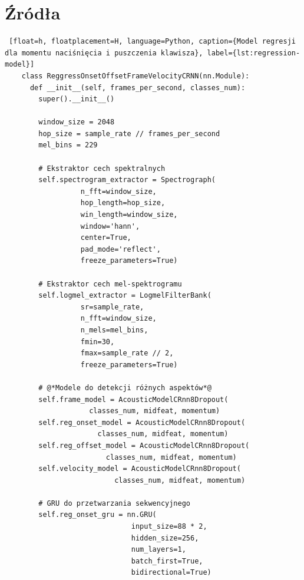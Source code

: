 \documentclass[a4paper,twoside,12pt]{book}
\begin{document}
\backmatter

\printbibliography           %

  \chapter{Źródła}
  \label{app:sources}
  
  \begin{lstlisting} [float=h, floatplacement=H, language=Python, caption={Model regresji dla momentu naciśnięcia i puszczenia klawisza}, label={lst:regression-model}]
    class ReggressOnsetOffsetFrameVelocityCRNN(nn.Module):
      def __init__(self, frames_per_second, classes_num):
        super().__init__()
        
        window_size = 2048
        hop_size = sample_rate // frames_per_second
        mel_bins = 229
        
        # Ekstraktor cech spektralnych
        self.spectrogram_extractor = Spectrograph(
                  n_fft=window_size,
                  hop_length=hop_size,
                  win_length=window_size,
                  window='hann',
                  center=True,
                  pad_mode='reflect',
                  freeze_parameters=True)
                  
        # Ekstraktor cech mel-spektrogramu
        self.logmel_extractor = LogmelFilterBank(
                  sr=sample_rate,
                  n_fft=window_size,
                  n_mels=mel_bins,
                  fmin=30,
                  fmax=sample_rate // 2,
                  freeze_parameters=True)
                    
        # @*Modele do detekcji różnych aspektów*@
        self.frame_model = AcousticModelCRnn8Dropout(
                    classes_num, midfeat, momentum)
        self.reg_onset_model = AcousticModelCRnn8Dropout(
                      classes_num, midfeat, momentum)
        self.reg_offset_model = AcousticModelCRnn8Dropout(
                        classes_num, midfeat, momentum)
        self.velocity_model = AcousticModelCRnn8Dropout(
                          classes_num, midfeat, momentum)
                            
        # GRU do przetwarzania sekwencyjnego
        self.reg_onset_gru = nn.GRU(
                              input_size=88 * 2,
                              hidden_size=256,
                              num_layers=1,
                              batch_first=True,
                              bidirectional=True)
  \end{lstlisting}
\end{document}
